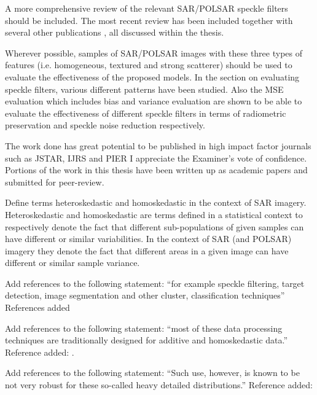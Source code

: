 \replyToComment
    {A more comprehensive review of the relevant SAR/POLSAR speckle filters should be included.}
    {The most recent review \cite{Argenti_GRSM_2013} has been included together with several other publications \cite{Lee_RSReviews_1994, Cetin_ProcSPIE_2000, White_ProcSPIE_1994, Sattar_TIP_1997, Wang_TIP_2004, Nielsen_2012_ICASSP}, all discussed within the thesis.}

\replyToComment
    {Wherever possible, samples of SAR/POLSAR images with these three types of features (i.e. homogeneous, textured and strong scatterer) should be used to evaluate the effectiveness of the proposed models.}
    {In the section on evaluating speckle filters, various different patterns have been studied. Also the MSE evaluation which includes bias and variance evaluation are shown to be able to evaluate the effectiveness of different speckle filters in terms of radiometric preservation and speckle noise reduction respectively.}
    
\replyToComment
    {The work done has great potential to be published in high impact factor journals such as JSTAR, IJRS and PIER}
    {I appreciate the Examiner's vote of confidence. Portions of the work in this thesis have been written up as academic papers and submitted for peer-review.}    

\replyToComment
    {Define terms heteroskedastic and homoskedastic in the context of SAR imagery.}
    {Heteroskedastic and homoskedastic are terms defined in a statistical context to respectively denote the fact that different sub-populations of given samples can have different or similar variabilities. In the context of SAR (and POLSAR) imagery they denote the fact that different areas in a given image can have different or similar sample variance.}  %

\replyToComment
    {Add references to the following statement: ``for example speckle filtering, target detection, image segmentation and other cluster, classification techniques''}
    {References added \cite{Lopez-Martinez_2003_TGRS_2232, Alberga_2008_IJRS_4129, Conradsen_2003_TGRS_4}}

\replyToComment
    {Add references to the following statement: ``most of these data processing techniques are traditionally designed for additive and homoskedastic data.''}
    {Reference added: \cite{Dutch_LNCS_2004}.}

\replyToComment
    {Add references to the following statement: ``Such use, however, is known to be not very robust for these so-called heavy detailed distributions.''}
    {Reference added: \cite{McElroy_Econometric_2002}}
    
